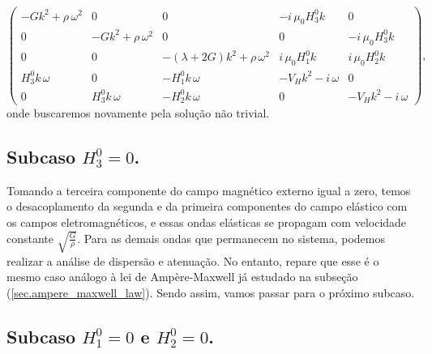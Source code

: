 \begin{equation*}
\begin{pmatrix}
-Gk^2+\rho\,\omega^2&0&0&-i\,\mu_0H^0_3k&0\\
0&-Gk^2+\rho\,\omega^2&0&0&-i\,\mu_0H^0_3k\\
0&0&-(\lambda+2G)k^2+\rho\,\omega^2&i\,\mu_0H^0_1k&i\,\mu_0H^0_2k\\
H^0_3k\,\omega&0&-H^0_1k\,\omega&-V_Hk^2-i\,\omega&0\\
0&H^0_3k\,\omega&-H^0_2k\,\omega&0&-V_Hk^2-i\,\omega
\end{pmatrix},
\end{equation*}
onde buscaremos novamente pela solu\c{c}\~ao n\~ao trivial.

\subsection{Subcaso $H_3^0=0$.}
Tomando a terceira componente do campo magn\'etico externo igual a zero, temos o desacoplamento da segunda e da primeira componentes do campo el\'astico com os campos eletromagn\'eticos, e essas ondas el\'asticas se propagam com velocidade constante $\sqrt{\frac{G}{\rho}}$. Para as demais ondas que permanecem no sistema, podemos realizar a an\'alise de dispers\~ao e atenua\c{c}\~ao. No entanto, repare que esse \'e o mesmo caso an\'alogo \`a lei de Amp\`ere-Maxwell j\'a estudado na subse\c{c}\~ao (\ref{sec.ampere_maxwell_law}). Sendo assim, vamos passar para o pr\'oximo subcaso.

\subsection{Subcaso $H_1^0=0$ e $H_2^0=0$.}

